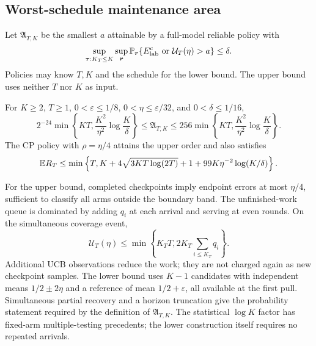 \documentclass[11pt]{article}
\begin{document}
\subsection{Worst-schedule maintenance area}

Let $\mathfrak A_{T,K}$ be the smallest $a$ attainable by a full-model reliable
policy with
\[
 \sup_{\boldsymbol\tau:K_T\le K}\sup_{\boldsymbol r}
 \mathbb P_{\boldsymbol r}\{E_{\rm lab}^c\ \text{or}\ \mathcal U_T(\eta)>a\}\le\delta.
\]
Policies may know $T,K$ and the schedule for the lower bound. The upper bound
uses neither $T$ nor $K$ as input.

\begin{theorem}
\label{thm:worst_area}
For $K\ge2$, $T\ge1$, $0<\varepsilon\le1/8$,
$0<\eta\le\varepsilon/32$, and $0<\delta\le1/16$,
\begin{equation}
 2^{-24}\min\left\{KT,\frac{K^2}{\eta^2}\log\frac K\delta\right\}
 \le\mathfrak A_{T,K}\le
 256\min\left\{KT,\frac{K^2}{\eta^2}\log\frac K\delta\right\}.
 \label{eq:worst_area}
\end{equation}
The CP policy with $\rho=\eta/4$ attains the upper order and also satisfies
\begin{equation}
 \mathbb E R_T\le\min\left\{T,K+4\sqrt{3KT\log(2T)}+1+
                         99K\eta^{-2}\log(K/\delta)\right\}.
 \label{eq:joint_general}
\end{equation}
\end{theorem}

For the upper bound, completed checkpoints imply endpoint errors at most
$\eta/4$, sufficient to classify all arms outside the boundary band. The
unfinished-work queue is dominated by adding $q_i$ at each arrival and serving
at even rounds. On the simultaneous coverage event,
\begin{equation}
 \mathcal U_T(\eta)\le\min\left\{K_TT,
                         2K_T\sum_{i\le K_T}q_i\right\}.
 \label{eq:queue_upper}
\end{equation}
Additional UCB observations reduce the work; they are not charged again as
new checkpoint samples. The lower bound uses $K-1$ candidates with independent
means $1/2\pm2\eta$ and a reference of mean $1/2+\varepsilon$, all available
at the first pull. Simultaneous partial recovery and a horizon truncation give
the probability statement required by the definition of $\mathfrak A_{T,K}$.
The statistical $\log K$ factor has fixed-arm multiple-testing precedents;
the lower construction itself requires no repeated arrivals.
\end{document}
